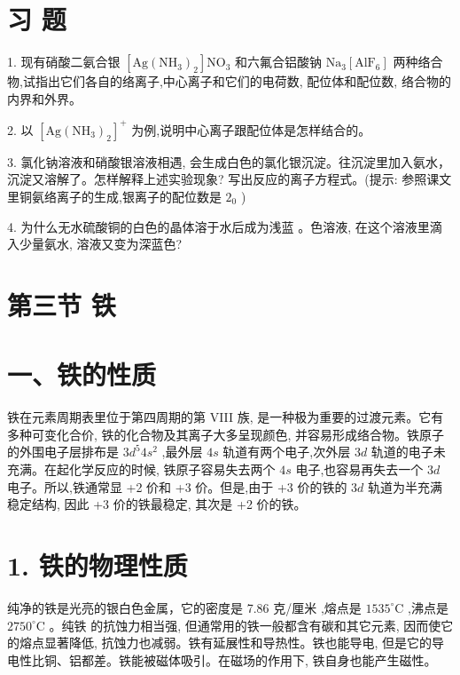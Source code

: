 \documentclass[10pt]{article}
\begin{document}
\section*{习 题}

1. 现有硝酸二氨合银 \(\left\lbrack {\mathrm{{Ag}}{\left( {\mathrm{{NH}}}_{3}\right) }_{2}}\right\rbrack {\mathrm{{NO}}}_{3}\) 和六氟合铝酸钠 \({\mathrm{{Na}}}_{3}\left\lbrack {\mathrm{{AlF}}}_{6}\right\rbrack\) 两种络合物,试指出它们各自的络离子,中心离子和它们的电荷数, 配位体和配位数, 络合物的内界和外界。

2. 以 \({\left\lbrack \mathrm{{Ag}}{\left( {\mathrm{{NH}}}_{3}\right) }_{2}\right\rbrack }^{ + }\) 为例,说明中心离子跟配位体是怎样结合的。

3. 氯化钠溶液和硝酸银溶液相遇, 会生成白色的氯化银沉淀。往沉淀里加入氨水，沉淀又溶解了。怎样解释上述实验现象? 写出反应的离子方程式。(提示: 参照课文里铜氨络离子的生成,银离子的配位数是 \({2}_{0}\) )

4. 为什么无水硫酸铜的白色的晶体溶于水后成为浅蓝 。色溶液, 在这个溶液里滴入少量氨水, 溶液又变为深蓝色?

\section*{第三节 铁}

\section*{一、铁的性质}

铁在元素周期表里位于第四周期的第 VIII 族, 是一种极为重要的过渡元素。它有多种可变化合价, 铁的化合物及其离子大多呈现颜色, 并容易形成络合物。铁原子的外围电子层排布是 \(3{d}^{5}4{s}^{2}\) ,最外层 \({4s}\) 轨道有两个电子,次外层 \({3d}\) 轨道的电子未充满。在起化学反应的时候, 铁原子容易失去两个 \({4s}\) 电子,也容易再失去一个 \({3d}\) 电子。所以,铁通常显 +2 价和 +3 价。但是,由于 +3 价的铁的 \({3d}\) 轨道为半充满稳定结构, 因此 +3 价的铁最稳定, 其次是 +2 价的铁。

\section*{1. 铁的物理性质}

纯净的铁是光亮的银白色金属，它的密度是 7.86 克/厘米 ,熔点是 \({1535}^{ \circ }\mathrm{C}\) ,沸点是 \({2750}^{ \circ }\mathrm{C}\) 。纯铁 的抗蚀力相当强, 但通常用的铁一般都含有碳和其它元素, 因而使它的熔点显著降低, 抗蚀力也减弱。铁有延展性和导热性。铁也能导电, 但是它的导电性比铜、铝都差。铁能被磁体吸引。在磁场的作用下, 铁自身也能产生磁性。
\end{document}
